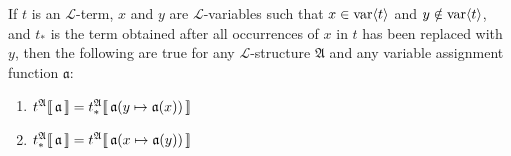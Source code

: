 \begin{thm}
     \label{thm:interpretation-of-terms-with-variable-symbols-replaced}
    If \( t \) is an \( \mathcal{L} \)-term, \( x \) and \( y \) are \( \mathcal{L} \)-variables such that \( x \in \operatorname{var} \langle t\rangle \) and \( y \notin \operatorname{var} \langle t\rangle \),
    and \( t_{\ast} \) is the term obtained after all occurrences of \( x \) in \( t \) has been replaced with \( y \),
    then the following are true for any \( \mathcal{L} \)-structure \( \mathfrak{A} \) and any variable assignment function \( \mathfrak{a} \):
    \begin{enumerate}[topsep=2pt,label=\textup{\texttt{(\alph*)}}]
        \item \( \folterminterpretation{t}{\mathfrak{A}}{\mathfrak{a}} =
                \folterminterpretation{t_{\ast}}{\mathfrak{A}}{ \folmodifiedvariableassignmentfunction{\mathfrak{a}}{y}{\mathfrak{a}(x)} } \)
        \item \( \folterminterpretation{t_{\ast}}{\mathfrak{A}}{\mathfrak{a}} =
                \folterminterpretation{t}{\mathfrak{A}}{ \folmodifiedvariableassignmentfunction{\mathfrak{a}}{x}{\mathfrak{a}(y)} }\)
    \end{enumerate}
\end{thm}

